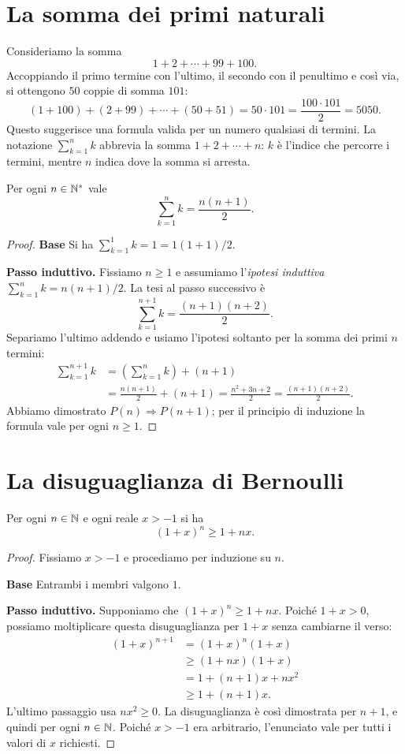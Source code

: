 \section{La somma dei primi naturali}

Consideriamo la somma
\[
  1+2+\cdots+99+100.
\]
Accoppiando il primo termine con l'ultimo, il secondo con il penultimo e così via, si ottengono $50$ coppie di somma $101$:
\[
  (1+100)+(2+99)+\cdots+(50+51)
  =50\cdot101=\frac{100\cdot101}{2}=5050.
\]
Questo suggerisce una formula valida per un numero qualsiasi di termini. La notazione $\sum_{k=1}^{n}k$ abbrevia la somma $1+2+\cdots+n$: $k$ è l'indice che percorre i termini, mentre $n$ indica dove la somma si arresta.

\begin{proposizione}
Per ogni $n\in\mathbb{N}^*$ vale
\[
  \sum_{k=1}^{n}k=\frac{n(n+1)}2.
\]
\end{proposizione}
\begin{proof}
\textbf{Base}\enspace{} Si ha $\sum_{k=1}^{1}k=1=1(1+1)/2$.

\textbf{Passo induttivo.} Fissiamo $n\ge1$ e assumiamo l'\emph{ipotesi induttiva} $\sum_{k=1}^{n}k=n(n+1)/2$. La tesi al passo successivo è
\[
  \sum_{k=1}^{n+1}k=\frac{(n+1)(n+2)}2.
\]
Separiamo l'ultimo addendo e usiamo l'ipotesi soltanto per la somma dei primi $n$ termini:
\begin{align*}
  \sum_{k=1}^{n+1}k
  &=\left(\sum_{k=1}^{n}k\right)+(n+1)\\
  &=\frac{n(n+1)}2+(n+1)
    =\frac{n^2+3n+2}{2}
    =\frac{(n+1)(n+2)}2.
\end{align*}
Abbiamo dimostrato $P(n)\Rightarrow P(n+1)$; per il principio di induzione la formula vale per ogni $n\ge1$.
\end{proof}

\section{La disuguaglianza di Bernoulli}

\begin{proposizione}
Per ogni $n\in\mathbb{N}$ e ogni reale $x>-1$ si ha
\[
  (1+x)^n\ge1+nx.
\]
\end{proposizione}
\begin{proof}
Fissiamo $x>-1$ e procediamo per induzione su $n$.

\textbf{Base}\enspace{} Entrambi i membri valgono $1$.

\textbf{Passo induttivo.} Supponiamo che $(1+x)^n\ge1+nx$. Poiché $1+x>0$, possiamo moltiplicare questa disuguaglianza per $1+x$ senza cambiarne il verso:
\begin{align*}
  (1+x)^{n+1}
  &=(1+x)^n(1+x)\\
  &\ge(1+nx)(1+x)\\
  &=1+(n+1)x+nx^2\\
  &\ge1+(n+1)x.
\end{align*}
L'ultimo passaggio usa $nx^2\ge0$. La disuguaglianza è così dimostrata per $n+1$, e quindi per ogni $n\in\mathbb{N}$. Poiché $x>-1$ era arbitrario, l'enunciato vale per tutti i valori di $x$ richiesti.
\end{proof}

